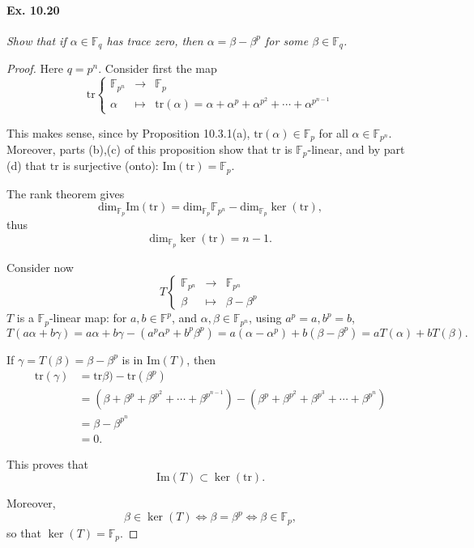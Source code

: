 \documentclass[11pt,a4paper]{article}
\newcommand{\F}{\mathbb{F}}
\begin{document}
\paragraph{Ex. 10.20} {\it Show that if $\alpha \in \F_q$ has trace zero, then $\alpha = \beta - \beta^p$ for some $\beta \in \F_q$.
}
\begin{proof}
Here $q = p^n$. Consider first the map
$$\mathrm{tr}
\left\{
\begin{array}{ccl}
\F_{p^n} & \to & \F_p\\
\alpha & \mapsto & \mathrm{tr}(\alpha) = \alpha + \alpha^p + \alpha^{p^2} + \cdots + \alpha^{p^{n-1}}
\end{array}
\right.
$$

This makes sense, since by Proposition 10.3.1(a), $\mathrm{tr}(\alpha) \in \F_p$ for all $\alpha \in \F_{p^n}$. Moreover, parts (b),(c) of this proposition show that $\mathrm{tr}$ is $\F_p$-linear, and by part (d) that $\mathrm{tr}$ is surjective (onto): $\mathrm{Im}(\mathrm{tr}) = \F_p$.

The rank theorem gives
$$\mathrm{dim}_{\F_p} \mathrm{Im}(\mathrm{tr}) = \mathrm{dim}_{\F_p} \F_{p^n} - \mathrm{dim}_{\F_p} \ker(\mathrm{tr}),$$
thus 
$$\mathrm{dim}_{\F_p} \ker(\mathrm{tr}) = n-1.$$

Consider now
$$
T 
\left\{
\begin{array}{ccl}
\F_{p^n} & \to& \F_{p^n}\\
\beta & \mapsto & \beta - \beta^p
\end{array}
\right.
$$
$T$ is a $\F_p$-linear map: for $a,b \in \F^p$, and $\alpha, \beta \in \F_{p^n}$, using $a^p = a, b^p = b$,
$$T(a \alpha + b \gamma) = a \alpha + b \gamma - (a^p \alpha^p +b^p \beta^p) = a (\alpha -\alpha^p) + b (\beta - \beta^p) = a T(\alpha) + b T(\beta).$$

If $\gamma = T(\beta) = \beta - \beta^p$ is in $\mathrm{Im}(T)$, then
\begin{align*}
\mathrm{tr}(\gamma) &= \mathrm{tr}\beta) - \mathrm{tr}(\beta^p)\\
&=\left(\beta + \beta^p + \beta^{p^2} + \cdots + \beta^{p^{n-1}}\right) - \left(\beta^p + \beta^{p^2} + \beta^{p^3} + \cdots + \beta^{p^{n}}\right)\\
&=\beta - \beta^{p^n}\\
&=0.
\end{align*}

This proves that $$\mathrm{Im}(T) \subset \ker(\mathrm{tr}).$$

Moreover, 
$$\beta \in \ker(T) \iff \beta = \beta^p \iff \beta \in \F_p,$$
so that $\ker(T) = \F_p$.


\end{proof}
\end{document}
